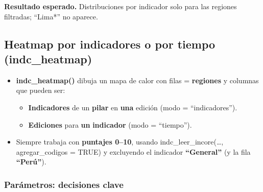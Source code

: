 \documentclass[
  11pt,
  letterpaper,
  DIV=11,
  numbers=noendperiod]{scrartcl}
\begin{document}
\textbf{Resultado esperado.} Distribuciones por indicador solo para las
regiones filtradas; ``Lima*'' no aparece.

\subsection{\texorpdfstring{\textbf{Heatmap por indicadores o por tiempo
(indc\_heatmap)}}{Heatmap por indicadores o por tiempo (indc\_heatmap)}}\label{heatmap-por-indicadores-o-por-tiempo-indc_heatmap}

\begin{itemize}
\item
  \textbf{indc\_heatmap()} dibuja un mapa de calor con filas =
  \textbf{regiones} y columnas que pueden ser:

  \begin{itemize}
  \item
    \textbf{Indicadores} de un \textbf{pilar} en \textbf{una} edición
    (modo = ``indicadores'').
  \item
    \textbf{Ediciones} para \textbf{un} \textbf{indicador} (modo =
    ``tiempo'').
  \end{itemize}
\item
  Siempre trabaja con \textbf{puntajes 0--10}, usando
  indc\_leer\_incore(\ldots, agregar\_codigos = TRUE) y excluyendo el
  indicador \textbf{``General''} (y la fila \textbf{``Perú''}).
\end{itemize}

\subsubsection{\texorpdfstring{\textbf{Parámetros: decisiones
clave}}{Parámetros: decisiones clave}}\label{paruxe1metros-decisiones-clave-5}
\end{document}
